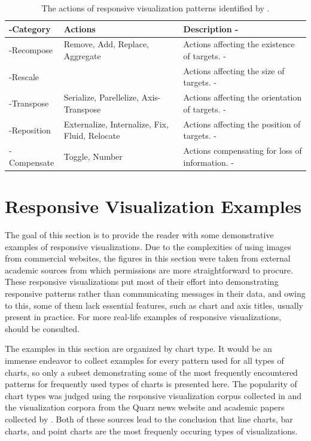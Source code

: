 \begin{table}[tp]
\tablestretch
{}
\centering
\begin{tabularx}{\linewidth}{>{\kern-\tabcolsep}l>{\raggedright}p{}X<{\kern-\tabcolsep}}
\toprule
Category   & Actions & Description \\
\midrule
Recompose  & Remove, Add, Replace, Aggregate &
Actions affecting the existence of targets. \\
Rescale    &  &
Actions affecting the size of targets. \\
Transpose  & Serialize, Parellelize, Axis-Transpose &
Actions affecting the orientation of targets. \\
Reposition & Externalize, Internalize, Fix, Fluid, Relocate &
Actions affecting the position of targets. \\
Compensate & Toggle, Number &
Actions compensating for loss of information. \\
\bottomrule
\end{tabularx}
\caption[Actions of Responsive Visualization Patterns]{%
The actions of responsive visualization patterns identified by
\textcite{DesignPatternsTradeOffsRespVis}.
}
\label{tab:PatternsActions}
\end{table}







\section{Responsive Visualization Examples}

The goal of this section is to provide the reader with some
demonstrative examples of responsive visualizations. Due to the
complexities of using images from commercial websites, the figures in
this section were taken from external academic sources from which
permissions are more straightforward to procure. These responsive
visualizations put most of their effort into demonstrating responsive
patterns rather than communicating messages in their data, and owing
to this, some of them lack essential features, such as chart and axis
titles, usually present in practice. For more real-life examples of
responsive visualizations,
\textcite{DesignPatternsTradeOffsRespVisGallery} should be consulted.

The examples in this section are organized by chart type. It would be
an immense endeavor to collect examples for every pattern used for all
types of charts, so only a subset demonstrating some of the most
frequently encountered patterns for frequently used types of charts is
presented here. The popularity of chart types was judged using the
responsive visualization corpus collected in
\textcite{DesignPatternsTradeOffsRespVisGallery} and the visualization
corpora from the Quarz news website and academic papers collected by
\textcite{ReverseEngineeringVisualizations}. Both of these sources
lead to the conclusion that line charts, bar charts, and point charts
are the most frequenly occuring types of visualizations.





